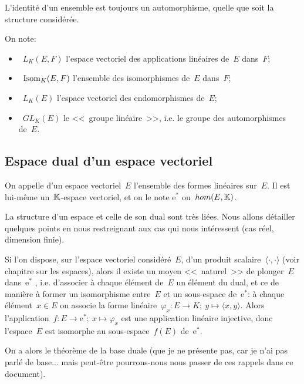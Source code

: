 \medskip
L'identité d'un ensemble est toujours un automorphisme, quelle que soit la structure considérée.

\medskip
On note:
\begin{itemize}
  \item~$L_K(E,F)$ l'espace vectoriel des applications linéaires de~$E$ dans~$F$;
  \item~$\operatorname{Isom}_K(E,F)$ l'ensemble des isomorphismes de~$E$ dans~$F$;
  \item~$L_K(E)$ l'espace vectoriel des endomorphismes de~$E$;
  \item~$GL_K(E)$ le <<~groupe linéaire~>>, i.e. le groupe des automorphismes de~$E$.
\end{itemize}

\medskip
\subsection{Espace dual d'un espace vectoriel}

\begin{definition}
On appelle  d'un espace vectoriel~$E$ l'ensemble des
formes linéaires sur~$E$. Il est lui-même un~$\mathbb K$-espace vectoriel, et on le note
$\mathrm{e}^*$ ou~$hom(E,\mathbb K)$.
\end{definition}

La structure d'un espace et celle de son dual sont très liées.
Nous allons détailler quelques points en nous restreignant aux cas qui nous
intéressent (cas réel, dimension finie).

\medskip
{}
Si l'on dispose, sur l'espace vectoriel considéré~$E$, d'un produit scalaire~$\langle\cdot,\cdot\rangle$ (voir
chapitre sur les espaces), alors il existe un moyen <<~naturel~>> de plonger~$E$ dans~$\mathrm{e}^*$ ,
i.e. d'associer à chaque élément de~$E$ un élément du dual, et ce de manière à
former un isomorphisme entre~$E$ et un sous-espace de~$\mathrm{e}^*$:
à chaque élément~$x\in E$ on associe la forme linéaire~$\varphi_x: E \to K;\ y \mapsto \langle x,y\rangle$.
Alors l'application~$f: E \to \mathrm{e}^*;\ x \mapsto \varphi_x$ est une application linéaire injective,
donc l'espace~$E$ est isomorphe au sous-espace~$f(E)$ de~$\mathrm{e}^*$.

\medskip
{}
On a alors le théorème de la base duale (que je ne présente pas, car je n'ai pas
parlé de base... mais peut-être pourrons-nous nous passer de ces rappels dans ce
document).

